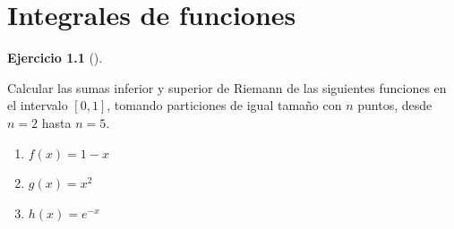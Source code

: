 \documentclass[
  a4paper,
]{scrreport}
\theoremstyle{definition}
\newtheorem{exercise}{Ejercicio}[chapter]
\theoremstyle{remark}
\begin{document}

\hypertarget{integrales-de-funciones}{%
\chapter{Integrales de funciones}\label{integrales-de-funciones}}

\begin{exercise}[]\protect\hypertarget{exr-sumas-inferiores-superiores-riemann}{}\label{exr-sumas-inferiores-superiores-riemann}

Calcular las sumas inferior y superior de Riemann de las siguientes
funciones en el intervalo \([0,1]\), tomando particiones de igual tamaño
con \(n\) puntos, desde \(n=2\) hasta \(n=5\).

\begin{enumerate}
\def\labelenumi{\alph{enumi}.}
\item
  \(f(x) = 1-x\)
\item
  \(g(x) = x^2\)
\item
  \(h(x) = e^{-x}\)
\end{enumerate}

\end{exercise}
\end{document}
